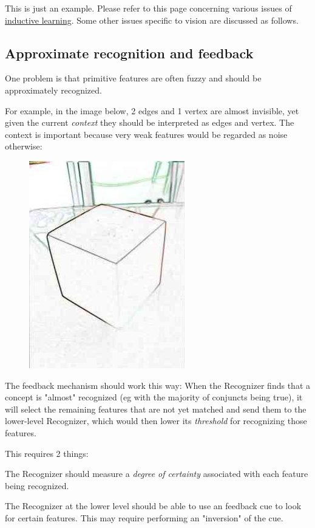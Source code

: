 This is just an example. Please refer to this page concerning  various issues of \href{Vis-InductiveLearning.htm}{inductive learning}. Some other issues specific to vision are discussed as follows.

\subsection{Approximate recognition and feedback}

One problem is that primitive features  are often fuzzy and should be approximately recognized.

For example, in the image below, 2 edges and 1 vertex are almost invisible, yet given the current \emph{context} they should be interpreted as edges and vertex. The context is important because very weak features would be regarded as noise otherwise:

\begin{figure}[H]
\centering
\includegraphics[scale=0.8]{CubeMissingEdge.png}
\end{figure}

The feedback mechanism should work this way: When the Recognizer finds that a concept is "almost" recognized (eg with the majority of conjuncts being true), it will select the remaining features that are not yet matched and send them to the lower-level Recognizer, which would then lower its \emph{threshold} for recognizing those features.

This requires 2 things:
\begin{compactenum}
	\item The Recognizer  should measure a \emph{degree of certainty} associated with each feature being recognized.
	\item  The Recognizer  at the lower level should be able to use an feedback cue to look for certain features. This may require performing an "inversion" of the cue.
\end{compactenum}

